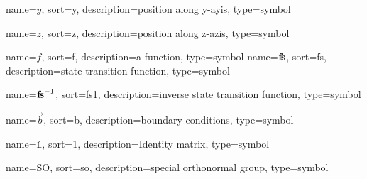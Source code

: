 	{%
		name=\ensuremath{y},
		sort=y,
		description=position along y-ayis,
		type=symbol
	}
	\newcommand{\ycoord}{\gls{sym:ycoord}}

	{%
		name=\ensuremath{z},
		sort=z,
		description=position along z-azis,
		type=symbol
	}
	\newcommand{\zcoord}{\gls{sym:zcoord}}

	{%
		name=\ensuremath{f},
		sort=f,
		description=a function,
		type=symbol
	}
	\newcommand{\function}{\gls{sym:function}}
	{%
	name=\ensuremath{\vecfunc{f\!s}},
		sort=fs,
		description=state transition function,
		type=symbol
	}
	\newcommand{\statetransfunc}{\gls{sym:statetransfunc}}

	{%
		name=\ensuremath{\vecfunc{f\!s}^{-1}},
		sort=fs1,
		description=inverse state transition function,
		type=symbol
	}
	\newcommand{\invstatetransfunc}{\gls{sym:invstatetransfunc}}

	{%
		name=\ensuremath{\vec{b}},
		sort=b,
		description=boundary conditions,
		type=symbol
	}
	\newcommand{\boundaryconditions}{\gls{sym:boundaryconditions}}

	{%
		name=\ensuremath{\mathds{1}},
		sort=1,
		description=Identity matrix,
		type=symbol
	}
	\newcommand{\id}{\gls{sym:id}}

	{%
		name=\ensuremath{\mathrm{SO}},
		sort=so,
		description=special orthonormal group,
		type=symbol
	}
	\newcommand{\specialOrthonormalGroupbare}{\gls{sym:specialOrthonormalGroup}}
	\newcommand{\specialOrthonormalGroup}[1]{\ensuremath{\specialOrthonormalGroupbare_{#1}}}

